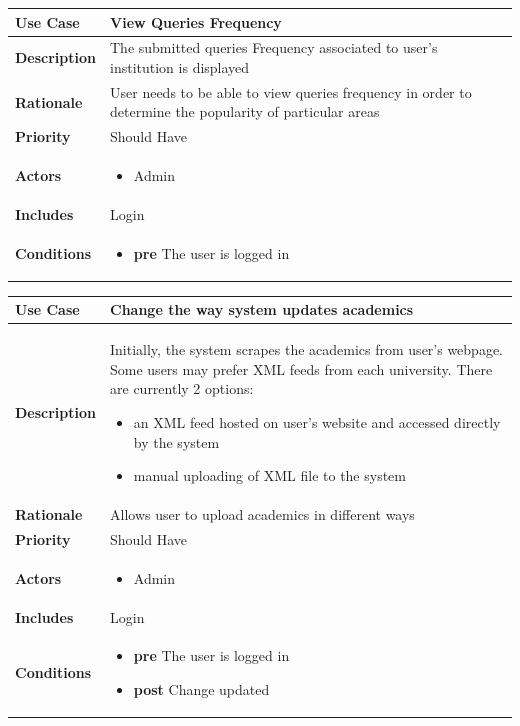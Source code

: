 
\begin{tabular}{|l|p{8.5cm}|}
\hline \textbf{Use Case} & View Queries Frequency \\
\hline \textbf{Description} & The submitted queries Frequency associated to user's institution is displayed \\
\hline \textbf{Rationale} & User needs to be able to view queries frequency in order to determine the popularity of particular areas \\
\hline \textbf{Priority} & Should Have \\ 
\hline \textbf{Actors} & 
\begin{itemize}
 \item Admin
\end{itemize} \\
\hline \textbf{Includes} & Login \\
\hline \textbf{Conditions} & 
\begin{itemize}
 \item \textbf{pre} The user is logged in
\end{itemize} \\ \hline
\end{tabular}


\begin{tabular}{|l|p{8.5cm}|}
\hline \textbf{Use Case} & Change the way system updates academics \\
 \hline \textbf{Description} & Initially, the system scrapes the academics from user's webpage. Some users may prefer XML feeds from each university.
 There are currently 2 options: 
 \begin{itemize}
  \item an XML feed hosted on user's website and accessed directly by the system
  \item manual uploading of XML file to the system
 \end{itemize} \\
\hline \textbf{Rationale} & Allows user to upload academics in different ways \\
\hline \textbf{Priority} & Should Have \\ 
\hline \textbf{Actors} & 
\begin{itemize}
 \item Admin
\end{itemize} \\
\hline \textbf{Includes} & Login \\
\hline \textbf{Conditions} & 
\begin{itemize}
 \item \textbf{pre} The user is logged in
 \item \textbf{post} Change updated
\end{itemize} \\ \hline
\end{tabular}

















